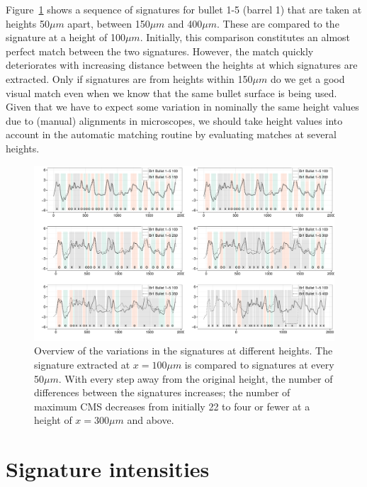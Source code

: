 \documentclass[aoas]{imsart}\usepackage[]{graphicx}\usepackage[]{color}
\newenvironment{knitrout}{}{} %
\begin{document}
Figure~\ref{fig:crosscuts} shows a sequence of signatures for bullet 1-5 (barrel 1) that are taken at heights 50$\mu m$ apart, between 150$\mu m$  and 400$\mu m$. These are compared to the signature at a height of 100$\mu m$. Initially, this comparison constitutes an almost perfect match between the two signatures. However, the match quickly deteriorates with increasing distance between the heights at which signatures are extracted.  Only if signatures are from heights  within 150$\mu m$ do we get a good visual match even when we know that the same bullet surface is being used. 
Given that we have to expect some variation in nominally the same height values due to (manual) alignments in microscopes, we should take height values into account in the automatic matching routine by evaluating matches at several heights. 
\begin{figure}[hbtp]
  \centering
\begin{knitrout}
\color{fgcolor}
\includegraphics[width=\textwidth]{crosscuts-vary-1} 

\end{knitrout}
\caption{\label{fig:crosscuts}Overview of the variations in the signatures at different heights. The signature extracted at $x = 100\mu m$ is compared to signatures at every 50$\mu m$. With every step away from the original height, the number of differences between the signatures increases; the number of maximum CMS decreases from initially 22 to  four or fewer at a height of $x = 300\mu m$ and above. }
\end{figure}

\newpage
\section{Signature intensities}\label{supp:bulletbottom}
\end{document}
